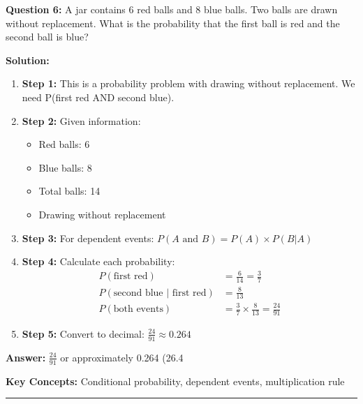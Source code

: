 \textbf{Question 6:} A jar contains 6 red balls and 8 blue balls. Two balls are drawn without replacement. What is the probability that the first ball is red and the second ball is blue?

\textbf{Solution:}
\begin{enumerate}
\item \textbf{Step 1:} This is a probability problem with drawing without replacement. We need P(first red AND second blue).

\item \textbf{Step 2:} Given information:
\begin{itemize}
\item Red balls: 6
\item Blue balls: 8
\item Total balls: 14
\item Drawing without replacement
\end{itemize}

\item \textbf{Step 3:} For dependent events: $P(A \text{ and } B) = P(A) \times P(B|A)$

\item \textbf{Step 4:} Calculate each probability:
\begin{align}
P(\text{first red}) &= \frac{6}{14} = \frac{3}{7} \\
P(\text{second blue | first red}) &= \frac{8}{13} \\
P(\text{both events}) &= \frac{3}{7} \times \frac{8}{13} = \frac{24}{91}
\end{align}

\item \textbf{Step 5:} Convert to decimal: $\frac{24}{91} \approx 0.264$
\end{enumerate}

\textbf{Answer:} $\frac{24}{91}$ or approximately 0.264 (26.4%

\textbf{Key Concepts:} Conditional probability, dependent events, multiplication rule

\hrule
\vspace{1em}
